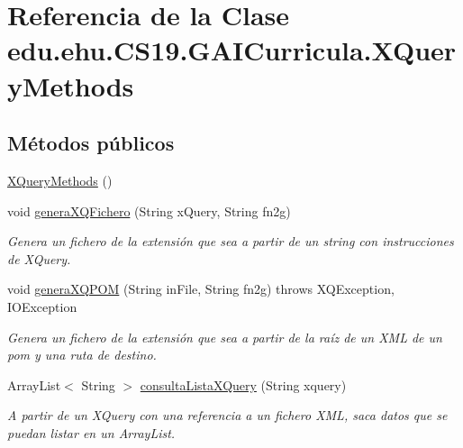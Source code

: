 \hypertarget{classedu_1_1ehu_1_1_c_s19_1_1_g_a_i_curricula_1_1_x_query_methods}{}\section{Referencia de la Clase edu.\+ehu.\+C\+S19.\+G\+A\+I\+Curricula.\+X\+Query\+Methods}
\label{classedu_1_1ehu_1_1_c_s19_1_1_g_a_i_curricula_1_1_x_query_methods}
\subsection*{Métodos públicos}
\begin{DoxyCompactItemize}
\item 
\mbox{\hyperlink{classedu_1_1ehu_1_1_c_s19_1_1_g_a_i_curricula_1_1_x_query_methods_ade5a845ccb94c1feb5420a2550243985}{X\+Query\+Methods}} ()
\item 
void \mbox{\hyperlink{classedu_1_1ehu_1_1_c_s19_1_1_g_a_i_curricula_1_1_x_query_methods_a7d2040d47b8350ca48da7ce5b658fab2}{genera\+X\+Q\+Fichero}} (String x\+Query, String fn2g)
\begin{DoxyCompactList}\small\item\em Genera un fichero de la extensión que sea a partir de un string con instrucciones de X\+Query. \end{DoxyCompactList}\item 
void \mbox{\hyperlink{classedu_1_1ehu_1_1_c_s19_1_1_g_a_i_curricula_1_1_x_query_methods_ae60f32c5f8b4ffe3f2bdd1f44976eacf}{genera\+X\+Q\+P\+OM}} (String in\+File, String fn2g)  throws X\+Q\+Exception, I\+O\+Exception 
\begin{DoxyCompactList}\small\item\em Genera un fichero de la extensión que sea a partir de la raíz de un X\+ML de un pom y una ruta de destino. \end{DoxyCompactList}\item 
Array\+List$<$ String $>$ \mbox{\hyperlink{classedu_1_1ehu_1_1_c_s19_1_1_g_a_i_curricula_1_1_x_query_methods_a8b0ac4baf3bbd3829073a87325dd714d}{consulta\+Lista\+X\+Query}} (String xquery)
\begin{DoxyCompactList}\small\item\em A partir de un X\+Query con una referencia a un fichero X\+ML, saca datos que se puedan listar en un Array\+List. \end{DoxyCompactList}\end{DoxyCompactItemize}


